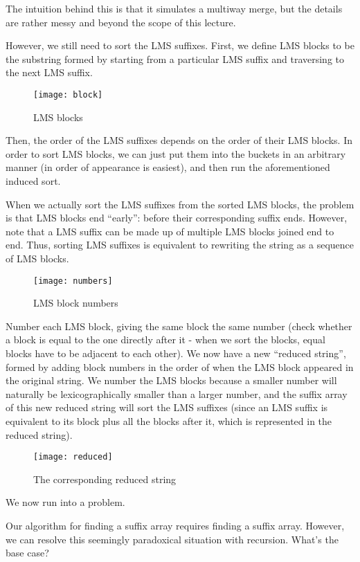 \documentclass[11pt, oneside]{article}
\begin{document}
The intuition behind this is that it simulates a multiway merge, but the details are rather messy and beyond the scope of this lecture.

However, we still need to sort the LMS suffixes. First, we define LMS blocks to be
the substring formed by starting from a particular LMS suffix and traversing to the next LMS suffix.


\begin{figure}[h!]
\centering
\texttt{[image: block]}
\caption{LMS blocks}
\end{figure}


Then, the order of the LMS suffixes depends on the order of their LMS blocks.
In order to sort LMS blocks, we can just put them into the buckets in an arbitrary manner (in order of appearance is easiest), and then run the aforementioned induced sort.

When we actually sort the LMS suffixes from the sorted LMS blocks, the problem is that LMS blocks end ``early'': before their corresponding suffix ends. However, note that a LMS suffix can be made up of multiple LMS blocks joined end to end.
Thus, sorting LMS suffixes is equivalent to rewriting the string as a sequence of LMS blocks.

\begin{figure}[h!]
\centering
\texttt{[image: numbers]}
\caption{LMS block numbers}
\end{figure}

Number each LMS block, giving the same block the same number
(check whether a block is equal to the one directly after it - when we sort the blocks, equal blocks have to be adjacent to each other).
We now have a new ``reduced string'', formed by adding block numbers in the order of when the LMS block appeared in the original string.
We number the LMS blocks because a smaller number will naturally be lexicographically smaller than a larger number,
and the suffix array of this new reduced string will sort the LMS suffixes
(since an LMS suffix is equivalent to its block plus all the blocks after it, which is represented in the reduced string).

\begin{figure}[h!]
\centering
\texttt{[image: reduced]}
\caption{The corresponding reduced string}
\end{figure}

We now run into a problem.

Our algorithm for finding a suffix array requires finding a suffix array.
However, we can resolve this seemingly paradoxical situation with recursion.
What's the base case?
\end{document}
